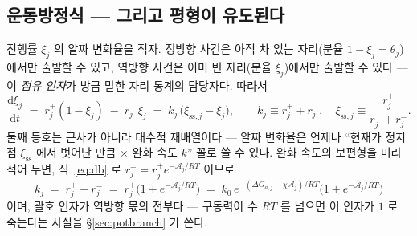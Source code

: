 \documentclass[11pt,a4paper]{article}
\newcommand{\dd}{\mathrm{d}}
\newcommand{\sstat}{\mathrm{ss}}
\begin{document}
\subsection{운동방정식 — 그리고 평형이 유도된다}
진행률 $\xi_j$ 의 알짜 변화율을 적자. 정방향 사건은 아직 차 있는 자리(분율 $1-\xi_j=\theta_j$)에서만
출발할 수 있고, 역방향 사건은 이미 빈 자리(분율 $\xi_j$)에서만 출발할 수 있다 — 이 \emph{점유 인자}가 방금 말한
자리 통계의 담당자다. 따라서
\begin{equation}
\frac{\dd\xi_j}{\dd t}\;=\;r_j^+(1-\xi_j)\;-\;r_j^-\,\xi_j
\;=\;k_j\,\big(\xi_{\sstat,j}-\xi_j\big),\qquad
k_j\equiv r_j^++r_j^-,\quad \xi_{\sstat,j}\equiv\frac{r_j^+}{r_j^++r_j^-}.
\label{eq:relax}
\end{equation}
둘째 등호는 근사가 아니라 대수적 재배열이다 — 알짜 변화율은 언제나 ``현재가 정지점 $\xi_{\sstat}$ 에서
벗어난 만큼 $\times$ 완화 속도 $k$'' 꼴로 쓸 수 있다. 완화 속도의 보편형을 미리 적어 두면, 식~\eqref{eq:db} 로 $r_j^-=r_j^+e^{-\mathcal A_j/RT}$
이므로
\begin{equation}
k_j\;=\;r_j^++r_j^-\;=\;r_j^+\big(1+e^{-\mathcal A_j/RT}\big)
\;=\;k_0\,e^{-(\Delta G_{a,j}-\chi\mathcal A_j)/RT}\big(1+e^{-\mathcal A_j/RT}\big)
\label{eq:kuniv}
\end{equation}
이며, 괄호 인자가 역방향 몫의 전부다 — 구동력이 수 $RT$ 를 넘으면 이 인자가 $1$ 로 죽는다는 사실을
\S\ref{sec:potbranch} 가 쓴다.
\end{document}
